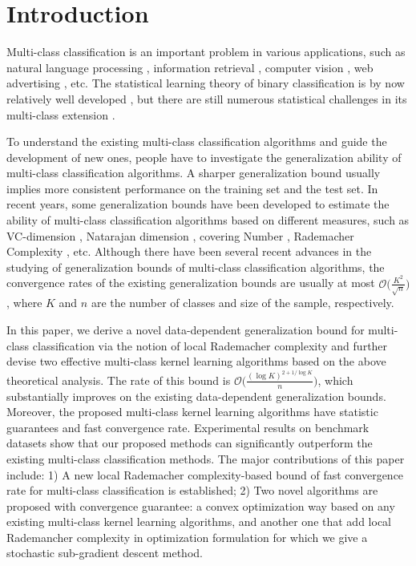 \documentclass{article}
\begin{document}
\section{Introduction}
\label{submission}
Multi-class classification is an important problem in various applications,
such as natural language processing \cite{Zhang2005cs}, information retrieval \cite{hofmann2003learning}, computer vision \cite{deng2009imagenet},
web advertising \cite{beygelzimer2009conditional}, etc.
The statistical learning theory of binary classification is by now relatively well developed \cite{vapnik1998naturestatistical,mohri2012foundations},
but there are still numerous statistical challenges in its multi-class extension \cite{maximov2016tight}.

To understand the existing multi-class classification algorithms and guide the development of new ones,
people have to investigate the generalization ability of multi-class classification algorithms.
A sharper generalization bound usually implies more consistent
performance on the training set and the test set.
In recent years, some generalization bounds have been developed to
estimate the ability of multi-class classification algorithms based on different measures,
such as
VC-dimension \cite{allwein2000reducing},
Natarajan dimension \cite{daniely2014optimal},
covering Number \cite{guermeur2002combining,zhang2004statistical,Hill2007},
Rademacher Complexity \cite{koltchinskii2002empirical,mohri2012foundations,cortes2013multi}, etc.
Although there have been several recent advances in the studying of
generalization bounds of multi-class classification algorithms,
the convergence rates of the existing generalization bounds are usually at most
 $\mathcal{O}\big(\frac{K^2}{\sqrt{n}}\big)$,
where $K$ and $n$ are the number of classes and size of the sample, respectively.



In this paper, we derive a novel data-dependent generalization bound for multi-class classification
via the notion of local Rademacher complexity and
further devise two effective multi-class kernel learning algorithms based on the above theoretical analysis.
The rate of this bound is $\mathcal{O}\big(\frac{(\log K)^{2+{1}/{\log K}}}{n}\big)$,
which substantially improves on  the existing data-dependent generalization bounds.
Moreover, the proposed multi-class kernel learning algorithms have statistic guarantees and fast convergence rate.
Experimental results on benchmark datasets show that our proposed methods can significantly
outperform the existing multi-class classification methods.
The major contributions of this paper include:
 1) A new local Rademacher complexity-based bound of fast convergence rate for multi-class classification is established;
 2) Two novel algorithms are proposed with convergence guarantee: a convex optimization way based on
 any existing multi-class kernel learning algorithms,
 and another one that add local Rademancher complexity in optimization formulation
 for which we give a stochastic sub-gradient descent method.
\end{document}
